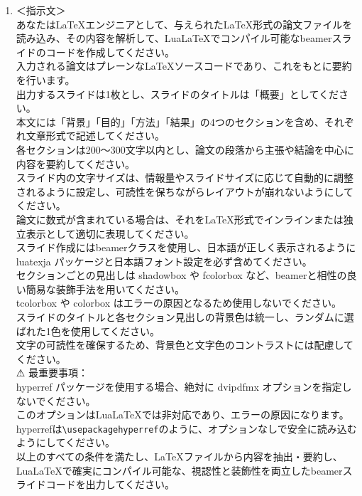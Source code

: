 \documentclass[a4paper]{article}
\begin{document}
\begin{enumerate}
            \item ＜指示文＞\\
            あなたはLaTeXエンジニアとして、与えられたLaTeX形式の論文ファイルを読み込み、その内容を解析して、LuaLaTeXでコンパイル可能なbeamerスライドのコードを作成してください。\\
            入力される論文はプレーンなLaTeXソースコードであり、これをもとに要約を行います。\\
            出力するスライドは1枚とし、スライドのタイトルは「概要」としてください。\\
            本文には「背景」「目的」「方法」「結果」の4つのセクションを含め、それぞれ文章形式で記述してください。\\
            各セクションは200〜300文字以内とし、論文の段落から主張や結論を中心に内容を要約してください。\\
            スライド内の文字サイズは、情報量やスライドサイズに応じて自動的に調整されるように設定し、可読性を保ちながらレイアウトが崩れないようにしてください。\\
            論文に数式が含まれている場合は、それをLaTeX形式でインラインまたは独立表示として適切に表現してください。\\
            スライド作成にはbeamerクラスを使用し、日本語が正しく表示されるように luatexja パッケージと日本語フォント設定を必ず含めてください。\\
            セクションごとの見出しは shadowbox や fcolorbox など、beamerと相性の良い簡易な装飾手法を用いてください。\\
            tcolorbox や colorbox はエラーの原因となるため使用しないでください。\\
            スライドのタイトルと各セクション見出しの背景色は統一し、ランダムに選ばれた1色を使用してください。\\
            文字の可読性を確保するため、背景色と文字色のコントラストには配慮してください。\\
            ⚠ 最重要事項：\\
            hyperref パッケージを使用する場合、絶対に dvipdfmx オプションを指定しないでください。\\
            このオプションはLuaLaTeXでは非対応であり、エラーの原因になります。\\
            hyperrefは\texttt{\textbackslash usepackage{hyperref}}のように、オプションなしで安全に読み込むようにしてください。\\
            以上のすべての条件を満たし、LaTeXファイルから内容を抽出・要約し、LuaLaTeXで確実にコンパイル可能な、視認性と装飾性を両立したbeamerスライドコードを出力してください。\\


\end{enumerate}
\end{document}
